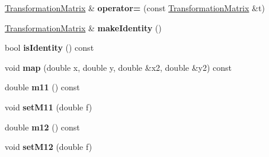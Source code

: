 \begin{DoxyCompactItemize}
\item 
\mbox{\label{class_web_core_1_1_transformation_matrix_ac0f59f7096750b393fe34b5a62e28182}} 
\mbox{\hyperlink{class_web_core_1_1_transformation_matrix}{Transformation\+Matrix}} \& {\bfseries operator=} (const \mbox{\hyperlink{class_web_core_1_1_transformation_matrix}{Transformation\+Matrix}} \&t)
\item 
\mbox{\label{class_web_core_1_1_transformation_matrix_a6adf56457f7544d2d522e1e20e0c6dac}} 
\mbox{\hyperlink{class_web_core_1_1_transformation_matrix}{Transformation\+Matrix}} \& {\bfseries make\+Identity} ()
\item 
\mbox{\label{class_web_core_1_1_transformation_matrix_ad792cfd21ca75d6f23852985b9859f39}} 
bool {\bfseries is\+Identity} () const
\item 
\mbox{\label{class_web_core_1_1_transformation_matrix_ae20cbdcf66baf2e71c3ddf3d95924276}} 
void {\bfseries map} (double x, double y, double \&x2, double \&y2) const
\item 
\mbox{\label{class_web_core_1_1_transformation_matrix_a865e9de02ea5a99bc9b5885b529fbd84}} 
double {\bfseries m11} () const
\item 
\mbox{\label{class_web_core_1_1_transformation_matrix_a9d5ac993f6632a9434f7b2bf6dd1140e}} 
void {\bfseries set\+M11} (double f)
\item 
\mbox{\label{class_web_core_1_1_transformation_matrix_ac348614f9d5b35c667e3b33b40399a3a}} 
double {\bfseries m12} () const
\item 
\mbox{\label{class_web_core_1_1_transformation_matrix_a819bd6c355f2af21e43bd5f19416fb70}} 
void {\bfseries set\+M12} (double f)
\item 
\mbox{\label{class_web_core_1_1_transformation_matrix_ad8df87dd74fef70f005075fcc8bc5379}} 

\end{DoxyCompactItemize}

